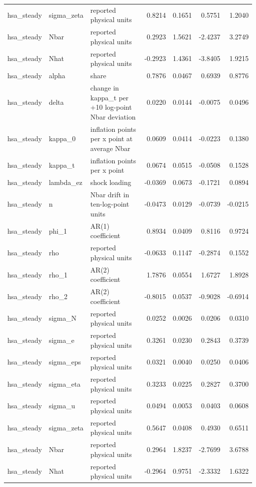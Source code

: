 \begin{tabular}{lllrrrr}
hsa\_steady & sigma\_zeta & reported physical units & 0.8214 & 0.1651 & 0.5751 & 1.2040 \\
hsa\_steady & Nbar & reported physical units & 0.2923 & 1.5621 & -2.4237 & 3.2749 \\
hsa\_steady & Nhat & reported physical units & -0.2923 & 1.4361 & -3.8405 & 1.9215 \\
hsa\_steady & alpha & share & 0.7876 & 0.0467 & 0.6939 & 0.8776 \\
hsa\_steady & delta & change in kappa\_t per +10 log-point Nbar deviation & 0.0220 & 0.0144 & -0.0075 & 0.0496 \\
hsa\_steady & kappa\_0 & inflation points per x point at average Nbar & 0.0609 & 0.0414 & -0.0223 & 0.1380 \\
hsa\_steady & kappa\_t & inflation points per x point & 0.0674 & 0.0515 & -0.0508 & 0.1528 \\
hsa\_steady & lambda\_ez & shock loading & -0.0369 & 0.0673 & -0.1721 & 0.0894 \\
hsa\_steady & n & Nbar drift in ten-log-point units & -0.0473 & 0.0129 & -0.0739 & -0.0215 \\
hsa\_steady & phi\_1 & AR(1) coefficient & 0.8934 & 0.0409 & 0.8116 & 0.9724 \\
hsa\_steady & rho & reported physical units & -0.0633 & 0.1147 & -0.2874 & 0.1552 \\
hsa\_steady & rho\_1 & AR(2) coefficient & 1.7876 & 0.0554 & 1.6727 & 1.8928 \\
hsa\_steady & rho\_2 & AR(2) coefficient & -0.8015 & 0.0537 & -0.9028 & -0.6914 \\
hsa\_steady & sigma\_N & reported physical units & 0.0252 & 0.0026 & 0.0206 & 0.0310 \\
hsa\_steady & sigma\_e & reported physical units & 0.3261 & 0.0230 & 0.2843 & 0.3739 \\
hsa\_steady & sigma\_eps & reported physical units & 0.0321 & 0.0040 & 0.0250 & 0.0406 \\
hsa\_steady & sigma\_eta & reported physical units & 0.3233 & 0.0225 & 0.2827 & 0.3700 \\
hsa\_steady & sigma\_u & reported physical units & 0.0494 & 0.0053 & 0.0403 & 0.0608 \\
hsa\_steady & sigma\_zeta & reported physical units & 0.5647 & 0.0408 & 0.4930 & 0.6511 \\
hsa\_steady & Nbar & reported physical units & 0.2964 & 1.8237 & -2.7699 & 3.6788 \\
hsa\_steady & Nhat & reported physical units & -0.2964 & 0.9751 & -2.3332 & 1.6322 \\

\end{tabular}
